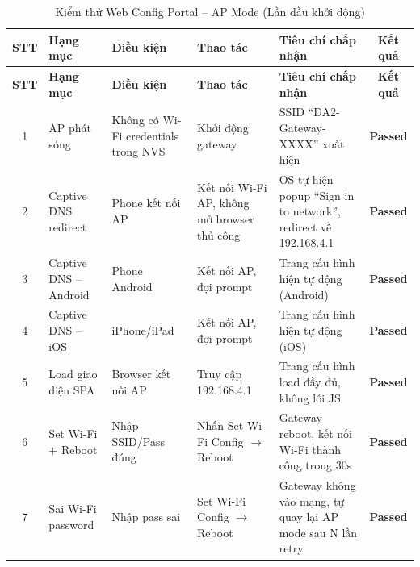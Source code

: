         \begin{longtable}{|c|p{}|p{}|p{}|p{}|c|}
            \caption{Kiểm thử Web Config Portal -- AP Mode (Lần đầu khởi động)}
            \label{tab:test_web_config_ap} \\
            \hline
            \textbf{STT} & \textbf{Hạng mục} & \textbf{Điều kiện} & \textbf{Thao tác} & \textbf{Tiêu chí chấp nhận} & \textbf{Kết quả} \\ \hline
            \endfirsthead
            \hline
            \textbf{STT} & \textbf{Hạng mục} & \textbf{Điều kiện} & \textbf{Thao tác} & \textbf{Tiêu chí chấp nhận} & \textbf{Kết quả} \\ \hline
            \endhead
            \hline
            \endfoot
            \endlastfoot
        
            1 & AP phát sóng & Không có Wi-Fi credentials trong NVS & Khởi động gateway & SSID ``DA2-Gateway-XXXX'' xuất hiện & \textcolor{modern_blue}{\textbf{Passed}} \\ \hline
            2 & Captive DNS redirect & Phone kết nối AP & Kết nối Wi-Fi AP, không mở browser thủ công & OS tự hiện popup ``Sign in to network'', redirect về 192.168.4.1 & \textcolor{modern_blue}{\textbf{Passed}} \\ \hline
            3 & Captive DNS -- Android & Phone Android & Kết nối AP, đợi prompt & Trang cấu hình hiện tự động (Android) & \textcolor{modern_blue}{\textbf{Passed}} \\ \hline
            4 & Captive DNS -- iOS & iPhone/iPad & Kết nối AP, đợi prompt & Trang cấu hình hiện tự động (iOS) & \textcolor{modern_blue}{\textbf{Passed}} \\ \hline
            5 & Load giao diện SPA & Browser kết nối AP & Truy cập 192.168.4.1 & Trang cấu hình load đầy đủ, không lỗi JS & \textcolor{modern_blue}{\textbf{Passed}} \\ \hline
            6 & Set Wi-Fi + Reboot & Nhập SSID/Pass đúng & Nhấn Set Wi-Fi Config $\rightarrow$ Reboot & Gateway reboot, kết nối Wi-Fi thành công trong 30s & \textcolor{modern_blue}{\textbf{Passed}} \\ \hline
            7 & Sai Wi-Fi password & Nhập pass sai & Set Wi-Fi Config $\rightarrow$ Reboot & Gateway không vào mạng, tự quay lại AP mode sau N lần retry & \textcolor{modern_blue}{\textbf{Passed}} \\ \hline
        \end{longtable}


